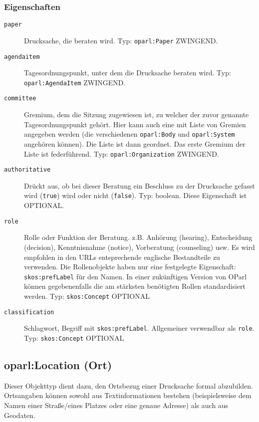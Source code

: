 \documentclass[,a4paper]{article}
\begin{document}
\subsubsection{Eigenschaften}\label{eigenschaften-8}

\begin{description}
\item[\texttt{paper}]
Drucksache, die beraten wird. Typ: \texttt{oparl:Paper} ZWINGEND.
\item[\texttt{agendaitem}]
Tagesordnungspunkt, unter dem die Drucksache beraten wird. Typ:
\texttt{oparl:AgendaItem} ZWINGEND.
\item[\texttt{committee}]
Gremium, dem die Sitzung zugewiesen ist, zu welcher der zuvor genannte
Tagesordnungspunkt gehört. Hier kann auch eine mit Liste von Gremien
angegeben werden (die verschiedenen \texttt{oparl:Body} und
\texttt{oparl:System} angehören können). Die Liste ist dann geordnet.
Das erste Gremium der Liste ist federführend. Typ:
\texttt{oparl:Organization} ZWINGEND.
\item[\texttt{authoritative}]
Drückt aus, ob bei dieser Beratung ein Beschluss zu der Drucksache
gefasst wird (\texttt{true}) wird oder nicht (\texttt{false}). Typ:
boolean. Diese Eigenschaft ist OPTIONAL.
\item[\texttt{role}]
Rolle oder Funktion der Beratung. z.B. Anhörung (hearing), Entscheidung
(decision), Kenntnisnahme (notice), Vorberatung (counseling) usw. Es
wird empfohlen in den URLs entsprechende englische Bestandteile zu
verwenden. Die Rollenobjekte haben nur eine festgelegte Eigenschaft:
\texttt{skos:prefLabel} für den Namen. In einer zukünftigen Version von
OParl können gegebenenfalls die am stärksten benötigten Rollen
standardisiert werden. Typ: \texttt{skos:Concept} OPTIONAL
\item[\texttt{classification}]
Schlagwort, Begriff mit \texttt{skos:prefLabel}. Allgemeiner verwendbar
als \texttt{role}. Typ: \texttt{skos:Concept} OPTIONAL
\end{description}

\subsection{oparl:Location (Ort)}\label{oparlux5flocation}

Dieser Objekttyp dient dazu, den Ortsbezug einer Drucksache formal
abzubilden. Ortsangaben können sowohl aus Textinformationen bestehen
(beispielsweise dem Namen einer Straße/eines Platzes oder eine genaue
Adresse) als auch aus Geodaten.
\end{document}
